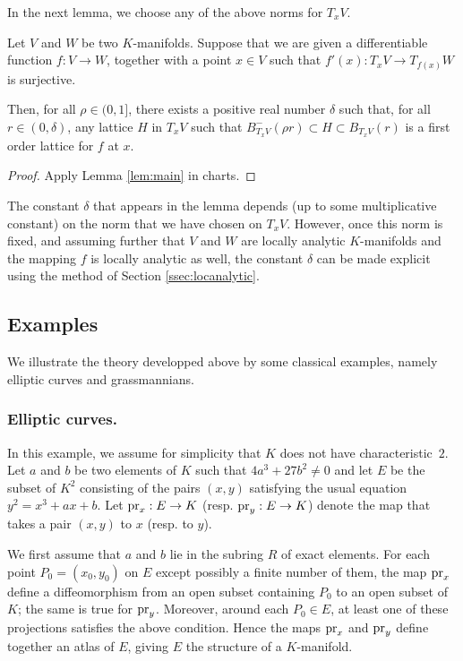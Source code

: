\documentclass{lms}
\begin{document}
In the next lemma, we choose any of the above norms for $T_x V$.

\begin{lem}
Let $V$ and $W$ be two $K$-manifolds. 
Suppose that we are given a differentiable function $f : V \to W$, 
together with a point $x \in V$ such that $f'(x) : T_x V \to T_{f(x)} W$ 
is surjective. 

Then, for all $\rho \in (0, 1]$, there exists a positive real 
number $\delta$ such that, for all $r \in (0, \delta)$, any lattice
$H$ in $T_x V$ such that $B^-_{T_x V}(\rho r) \subset H \subset B_{T_x V}(r)$ is a first
order lattice for $f$ at $x$.
\end{lem}

\begin{proof}
Apply Lemma \ref{lem:main} in charts.
\end{proof}

\begin{rmk}
The constant $\delta$ that appears in the lemma depends (up to
some multiplicative constant) on the norm that we have chosen on $T_x V$. 
However, once this norm is fixed, and assuming further that $V$ and $W$ 
are locally analytic $K$-manifolds and the mapping $f$ is locally 
analytic as well, the constant $\delta$ can be made explicit using the 
method of Section \ref{ssec:locanalytic}.
\end{rmk}

\subsection{Examples}
\label{ssec:exmanifold}

We illustrate the theory developped above by some classical examples,
namely elliptic curves and grassmannians.

\subsubsection*{Elliptic curves.}

In this example, we assume for simplicity that $K$ does not have characteristic~$2$.
Let $a$ and $b$ be two elements of $K$ such that $4 a^3 + 27 b^2 
\neq 0$ and let $E$ be the subset of $K^2$ consisting of the pairs 
$(x,y)$ satisfying the usual equation $y^2 = x^3 + a x + b$.
Let $\text{\rm pr}_x : E \to K$ (resp. $\text{\rm pr}_y : E \to K$) denote the map that 
takes a pair $(x,y)$ to $x$ (resp. to $y$).

We first assume that $a$ and $b$ lie in the subring $R$ of exact elements. For each point $P_0 = 
(x_0, y_0)$ on $E$ except possibly a finite number of them, the map 
$\text{\rm pr}_x$ define a diffeomorphism from an open subset containing $P_0$ to 
an open subset of $K$; the same is true for $\text{\rm pr}_y$. Moreover, around each 
$P_0 \in E$, at least one of these projections satisfies the above condition.
Hence the maps $\text{\rm pr}_x$ and $\text{\rm pr}_y$ define together an atlas of $E$, giving $E$ the structure of 
a $K$-manifold.
\end{document}
